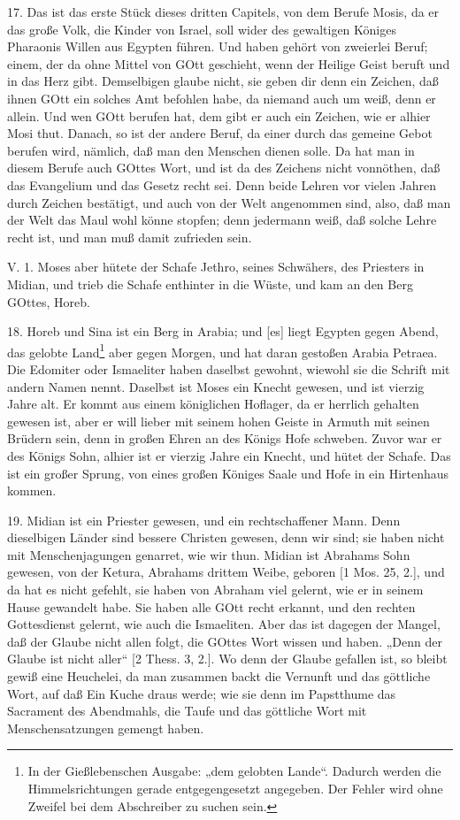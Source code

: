 17. Das ist das erste Stück dieses dritten Capitels, von dem Berufe Mosis, da er das große Volk, die Kinder von Israel, soll wider des gewaltigen Königes Pharaonis Willen aus Egypten führen. Und haben gehört von zweierlei Beruf; einem, der da ohne Mittel von GOtt geschieht, wenn der Heilige Geist beruft und in das Herz gibt. Demselbigen glaube nicht, sie
geben dir denn ein Zeichen, daß ihnen GOtt ein solches Amt befohlen habe, da niemand auch um weiß, denn er allein. Und wen GOtt berufen hat, dem gibt er auch ein Zeichen, wie er alhier Mosi thut. Danach, so ist der andere Beruf, da einer durch das gemeine Gebot berufen wird, nämlich, daß man den Menschen dienen solle. Da hat man in diesem Berufe auch GOttes Wort, und ist da des Zeichens nicht vonnöthen, daß das Evangelium und das Gesetz recht sei. Denn beide Lehren vor vielen Jahren durch Zeichen bestätigt, und auch von der Welt angenommen sind, also, daß man der Welt das Maul wohl könne stopfen; denn jedermann weiß, daß solche Lehre recht ist, und man muß damit zufrieden sein.

\begin{schriftzitat}
V. 1. Moses aber hütete der Schafe Jethro, seines Schwähers, des Priesters in Midian, und trieb die Schafe enthinter in die Wüste, und kam an den Berg GOttes, Horeb.
\end{schriftzitat}

18. Horeb und Sina ist ein Berg in Arabia; und [es] liegt Egypten gegen Abend, das gelobte Land\footnote{In der Gießlebenschen Ausgabe: „dem gelobten Lande“. Dadurch werden die Himmelsrichtungen gerade entgegengesetzt angegeben. Der Fehler wird ohne Zweifel bei dem Abschreiber zu suchen sein.} aber gegen Morgen, und hat daran gestoßen Arabia Petraea. Die Edomiter oder Ismaeliter haben daselbst gewohnt, wiewohl sie die Schrift mit andern Namen nennt. Daselbst ist Moses ein Knecht gewesen, und ist vierzig Jahre alt. Er kommt aus einem königlichen Hoflager, da er herrlich gehalten gewesen ist, aber er will lieber mit seinem hohen Geiste in Armuth mit seinen Brüdern sein, denn in großen Ehren an des Königs Hofe schweben. Zuvor war er des Königs Sohn, alhier ist er vierzig Jahre ein Knecht, und hütet der Schafe. Das ist ein großer Sprung, von eines großen Königes Saale und Hofe in ein Hirtenhaus kommen.

19. Midian ist ein Priester gewesen, und ein rechtschaffener Mann. Denn dieselbigen Länder sind bessere Christen gewesen, denn wir sind; sie haben nicht mit Menschenjagungen genarret, wie wir thun. Midian ist Abrahams Sohn gewesen, von der Ketura, Abrahams drittem Weibe, geboren [1 Mos. 25, 2.], und da hat es nicht gefehlt, sie haben von Abraham viel gelernt, wie er in seinem Hause gewandelt habe. Sie haben alle GOtt recht erkannt, und den rechten Gottesdienst gelernt, wie auch die Ismaeliten. Aber das ist dagegen der Mangel, daß der Glaube nicht allen folgt, die GOttes Wort wissen und haben. „Denn der Glaube ist nicht aller“ [2 Thess. 3, 2.]. Wo denn der Glaube gefallen ist, so bleibt gewiß eine Heuchelei, da man zusammen backt die Vernunft und das göttliche Wort, auf daß Ein Kuche draus werde; wie sie denn im Papstthume das Sacrament des Abendmahls, die Taufe und das göttliche Wort mit Menschensatzungen gemengt haben.

